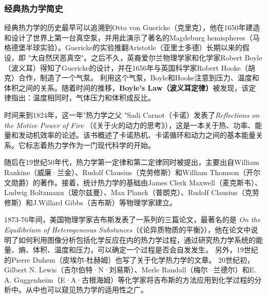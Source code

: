 \subsubsection{经典热力学简史}

\qquad 经典热力学的历史最早可以追溯到Otto von Guericke（克里克），他在1650年建造和设计了世界上第一台真空泵，并用此演示了著名的Magdeburg hemispheres（马格德堡半球实验）。Guericke的实验推翻Aristotle（亚里士多德）长期以来的假设，即 "大自然厌恶真空"。之后不久，英裔爱尔兰物理学家和化学家Robert Boyle（波义耳）得知了Guericke的设计，并在1656年与英国科学家Robert Hooke（胡克）合作，制造了一个气泵。\cite{partington1989short} 利用这个气泵，Boyle和Hooke注意到压力、温度和体积之间的关系。随着时间的推移，\textbf{Boyle's Law（波义耳定律）}被发现，该定律指出：温度相同时，气体压力和体积成反比。

时间来到1824年，这一年"热力学之父 "Sadi Carnot（卡诺）发表了\textit{Reflections on the Motive Power of Fire} （《关于火的动力的思考》），这是一本关于热、功率、能量和发动机效率的论述。该书概述了卡诺热机、卡诺循环和动力之间的基本能量关系。它标志着热力学作为一门现代科学的开始。\cite{perrot1998z}

随后在19世纪50年代，热力学第一定律和第二定律同时被提出，主要出自William Rankine（威廉·兰金）、Rudolf Clausius（克劳修斯）和William Thomson（开尔文勋爵）的著作。接着，统计热力学的基础由James Clerk Maxwell（麦克斯韦）、Ludwig Boltzmann（玻尔兹曼）、Max Planck（普朗克）、Rudolf Clausius（克劳修斯）和J.Willard Gibbs（吉布斯）等物理学家建立。

1873-76年间，美国物理学家吉布斯发表了一系列的三篇论文，最著名的是\textit{ On the Equilibrium of Heterogeneous Substances}（《论异质物质的平衡》）\cite{connecticut1866transactions}，他在论文中说明了如何利用图像分析包括化学反应在内的热力学过程，通过研究热力学系统的能量、熵、体积、温度和压力，可以确定一个过程是否会自发发生。\cite{sugi1993scientific} 另外，19世纪的Pierre Duhem（皮埃尔-杜赫姆）也写了关于化学热力学的文章\cite{duhem1886potentiel}。 20世纪初，Gilbert N. Lewis（吉尔伯特·N·刘易斯）、Merle Randall（梅尔·兰德尔）\cite{lewis1923thermodynamics}和E. A. Guggenheim（E·A·古根海姆）\cite{guggenheim2002modern,guggenheim1967advanced}等化学家将吉布斯的方法应用到化学过程的分析中。从中也可以窥见热力学的适用性之广。

